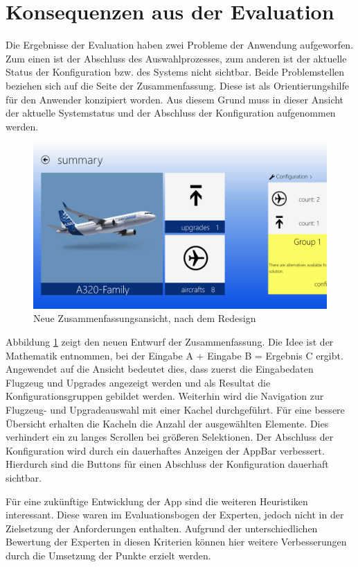 \section{Konsequenzen aus der Evaluation}
Die Ergebnisse der Evaluation haben zwei Probleme der Anwendung aufgeworfen. Zum einen ist der Abschluss des Auswahlprozesses, zum anderen ist der aktuelle Status der Konfiguration bzw. des Systems nicht sichtbar. Beide Problemstellen beziehen sich auf die Seite der Zusammenfassung. Diese ist als Orientierungshilfe für den Anwender konzipiert worden. Aus diesem Grund muss in dieser Ansicht der aktuelle Systemstatus und der Abschluss der Konfiguration aufgenommen werden.  
\begin{figure}[H]
\includegraphics[width=\hsize]{images/impl/summary_impl}
\caption{Neue Zusammenfassungsansicht, nach dem Redesign}
\label{redesignSummary}
\end{figure}
Abbildung \ref{redesignSummary} zeigt den neuen Entwurf der Zusammenfassung. Die Idee ist der Mathematik entnommen, bei der Eingabe A + Eingabe B = Ergebnis C ergibt. Angewendet auf die Ansicht bedeutet dies, dass zuerst die Eingabedaten Flugzeug und Upgrades angezeigt werden und als Resultat die Konfigurationsgruppen gebildet werden. Weiterhin wird die Navigation zur Flugzeug- und Upgradeauswahl mit einer Kachel durchgeführt. Für eine bessere Übersicht erhalten die Kacheln die Anzahl der ausgewählten Elemente. Dies verhindert ein zu langes Scrollen bei größeren Selektionen. 
Der Abschluss der Konfiguration wird durch ein dauerhaftes Anzeigen der AppBar verbessert. Hierdurch sind die Buttons für einen Abschluss der Konfiguration dauerhaft sichtbar.\par 

Für eine zukünftige Entwicklung der App sind die weiteren Heuristiken interessant. Diese waren im Evaluationsbogen der Experten, jedoch nicht in der Zielsetzung der Anforderungen enthalten. Aufgrund der unterschiedlichen Bewertung der Experten in diesen Kriterien können hier weitere Verbesserungen durch die Umsetzung der Punkte erzielt werden. \par 